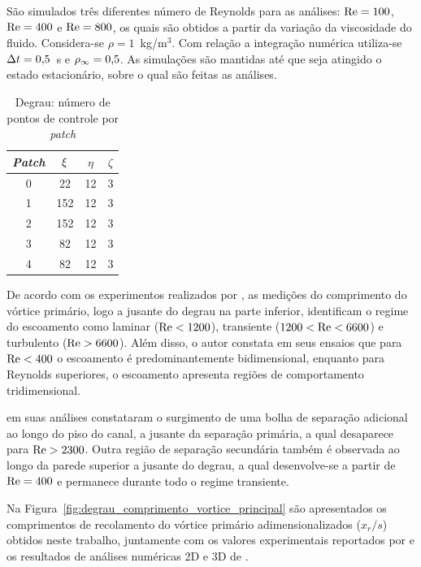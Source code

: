 São simulados três diferentes número de Reynolds para as análises: $\mathrm{Re} = 100$, $\mathrm{Re} = 400$ e $\mathrm{Re} = 800$, os quais são obtidos a partir da variação da viscosidade do fluido. Considera-se  $\rho = 1$~kg/m$^{3}$. Com relação a integração numérica utiliza-se $\Delta t = 0\text{,}5$~s e $\rho_\infty = 0\text{,}5$. As simulações são mantidas até que seja atingido o estado estacionário, sobre o qual são feitas as análises.

\begin{center}
	\begin{table}[!htbp]
		\caption{Degrau: número de pontos de controle por \textit{patch}}
		\label{tab:degrau_discretização_patches}
		\centering
		\begin{tabular}{cccc} 
			\toprule
			\textit{Patch} & $\xi$ & $\eta$ & $\zeta$ \\ 
			\midrule \midrule
			0 & 22 & 12 & 3 \\ 
			\midrule
			1 & 152 & 12 & 3\\
			\midrule
			2 & 152 & 12 & 3\\
			\midrule
			3 & 82 & 12 & 3\\
			\midrule
			4 & 82 & 12 & 3\\
			\bottomrule
		\end{tabular}
	\end{table}
\end{center}

De acordo com os experimentos realizados por , as medições do comprimento do vórtice primário, logo a jusante do degrau na parte inferior, identificam o regime do escoamento como laminar ($\mathrm{Re} < 1200$), transiente ($1200 < \mathrm{Re} < 6600$) e turbulento ($\mathrm{Re} > 6600$). Além disso, o autor constata em seus ensaios que para $\mathrm{Re} < 400$ o escoamento é predominantemente bidimensional, enquanto para Reynolds superiores, o escoamento apresenta regiões de comportamento tridimensional. 

 em suas análises constataram o surgimento de uma bolha de separação adicional ao longo do piso do canal, a jusante da separação primária, a qual desaparece para $\mathrm{Re} > 2300$. Outra região de separação secundária também é observada ao longo da parede superior a jusante do degrau, a qual desenvolve-se a partir de $\mathrm{Re}=400$ e permanece durante todo o regime transiente.

Na Figura~\ref{fig:degrau_comprimento_vortice_principal} são apresentados os comprimentos de recolamento do vórtice primário adimensionalizados ($x_{r}/s$) obtidos neste trabalho, juntamente com os valores experimentais reportados por  e os resultados de análises numéricas 2D e 3D de . 

